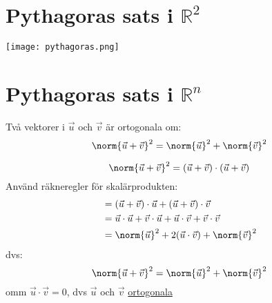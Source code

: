 \section{Pythagoras sats i $\mathbb{R}^2$} %
\label{sec:pythagoras_sats}
\begin{center}
	\texttt{[image: pythagoras.png]}
\end{center}

\section{Pythagoras sats i $\mathbb{R}^n$} %
\label{sec:pythagoras_sats_i_}
\begin{sats}
    Två vektorer i $\vec{u}$ och $\vec{v}$ är ortogonala om:
\[
    \norm{\vec{u} + \vec{v}}^2 = \norm{\vec{u}}^2 + \norm{\vec{v}}^2
\]

\end{sats}
\begin{bevis}
	\[
	    \norm{\vec{u} + \vec{v}}^2 = (\vec{u} + \vec{v}) \cdot (\vec{u} + \vec{v})
	\]
	Använd räkneregler för skalärprodukten:
	\begin{align*}
	&= (\vec{u} + \vec{v}) \cdot \vec{u} + (\vec{u} + \vec{v}) \cdot \vec{v} \\
	&= \vec{u} \cdot \vec{u} + \vec{v} \cdot \vec{u} + \vec{u} \cdot \vec{v} + \vec{v} \cdot \vec{v} \\
	&= \norm{\vec{u}}^2+ 2(\vec{u} \cdot \vec{v}) + \norm{\vec{v}}^2
	\end{align*}
	dvs:
	\[
	    \norm{\vec{u} + \vec{v}}^2 = \norm{\vec{u}}^2 + \norm{\vec{v}}^2
	\]
	omm $\vec{u} \cdot \vec{v} = 0$, dvs $\vec{u}$ och $\vec{v}$ \underline{ortogonala}
\end{bevis}

